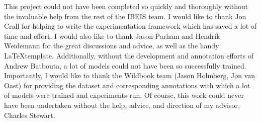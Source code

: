 This project could not have been completed so quickly and thoroughly without the invaluable help from the rest of the IBEIS team.
I would like to thank Jon Crall for helping to write the experimentation framework which has saved a lot of time and effort.
I would also like to thank Jason Parham and Hendrik Weidemann for the great discussions and advice, as well as the handy \LaTeX template. 
Additionally, without the development and annotation efforts of Andrew Batbouta, a lot of models could not have been so successfully trained. 
Importantly, I would like to thank the Wildbook team (Jason Holmberg, Jon van Oast) for providing the dataset and corresponding annotations with which a lot of models were trained and experiments run. 
Of course, this work could never have been undertaken without the help, advice, and direction of my advisor, Charles Stewart. 

